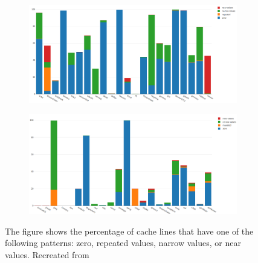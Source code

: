\begin{figure}
    \begin{subfigure}[t]{\textwidth}
        \includegraphics[width=\textwidth]{BDIPotential1.png}
    \end{subfigure}
    \begin{subfigure}[b]{\textwidth}
        \includegraphics[width=\textwidth]{BDIPotential2.png}
    \end{subfigure}
    \caption[Intra-line Patterns]{The figure shows the percentage of cache lines that have one of the following patterns: zero, repeated values, narrow values, or near values. Recreated from \protect\cite{bdi}}
    \label{fig:BDIPotential}
\end{figure}
